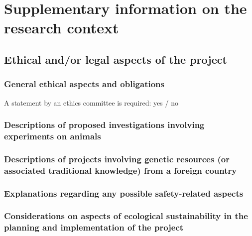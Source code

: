 \documentclass{scrartcl}
\begin{document}
\section{Supplementary information on the research context}

\subsection{Ethical and/or legal aspects of the project}

\subsubsection{General ethical aspects and obligations}

A statement by an ethics committee is required: yes / no

\subsubsection{Descriptions of proposed investigations involving experiments on animals}

\subsubsection{Descriptions of projects involving genetic resources (or associated traditional knowledge) from a foreign country}

\subsubsection{Explanations regarding any possible safety-related aspects}



\subsubsection{Considerations on aspects of ecological sustainability in the planning and implementation of the project}

\end{document}
